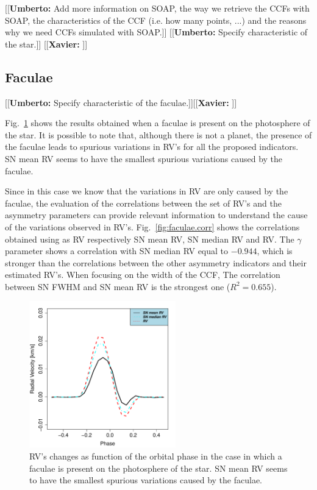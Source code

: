 \documentclass[11pt, oneside]{article}
\newcommand{\xavier}[1]{{\color{blue}[[\textbf{Xavier: }#1]]}}
\newcommand{\umberto}[1]{{\color{green}[[\textbf{Umberto: }#1]]}}
\begin{document}
\umberto{Add more information on SOAP, the way we retrieve the CCFs with SOAP, the characteristics of the CCF (i.e. how many points, ...) and the reasons why we need CCFs simulated with SOAP.}
\umberto{Specify characteristic of the star.}
\xavier{}

\subsection{Faculae} \label{sec:soap.faculae}

\umberto{Specify characteristic of the faculae.}\xavier{}

Fig.~\ref{fig:faculae} shows the results obtained when a faculae is present on the photosphere of the star. It is possible to note that, although there is not a planet, the presence of the faculae leads to spurious variations in RV's for all the proposed indicators. SN mean RV seems to have the smallest spurious variations caused by the faculae. 

Since in this case we know that the variations in RV are only caused by the faculae, the evaluation of the correlations between the set of RV's and the asymmetry parameters can provide relevant information to understand the cause of the variations observed in RV's. Fig.~\ref{fig:faculae.corr} shows the correlations obtained using as RV respectively SN mean RV, SN median RV and RV. The $\gamma$ parameter shows a correlation with SN median RV equal to $-0.944$, which is stronger than the correlations between the other asymmetry indicators and their estimated RV's. When focusing on the width of the CCF, The correlation between SN FWHM and SN mean RV is the strongest one ($R^{2}=0.655$).

\begin{figure}[htbp]
   \centering
\includegraphics[height = 2.5in]{RV_comparison_FACULAE.pdf} 
\caption{RV's changes as function of the orbital phase in the case in which a faculae is present on the photosphere of the star. SN mean RV seems to have the smallest spurious variations caused by the faculae.}
    \label{fig:faculae}
\end{figure}
\end{document}
